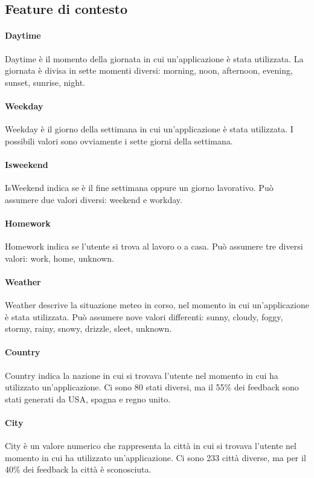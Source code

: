\documentclass[12pt,italian]{report}
\begin{document}
\subsection{Feature di contesto}
\paragraph{Daytime} Daytime è il momento della giornata in cui un'applicazione è stata utilizzata. La giornata è divisa in sette momenti diversi: morning, noon, afternoon, evening, sunset, sunrise, night.

\paragraph{Weekday} Weekday è il giorno della settimana in cui un'applicazione è stata utilizzata. I possibili valori sono ovviamente i sette giorni della settimana.

\paragraph{Isweekend} IsWeekend indica se è il fine settimana oppure un giorno lavorativo. Può assumere due valori diversi: weekend e workday.

\paragraph{Homework} Homework indica se l'utente si trova al lavoro o a casa. Può assumere tre diversi valori: work, home, unknown.

\paragraph{Weather} Weather descrive la situazione meteo in corso, nel momento in cui un'applicazione è stata utilizzata. Può assumere nove valori differenti: sunny, cloudy, foggy, stormy, rainy, snowy, drizzle, sleet, unknown.

\paragraph{Country} Country indica la nazione in cui si trovava l'utente nel momento in cui ha utilizzato un'applicazione. Ci sono 80 stati diversi, ma il 55\% dei feedback sono stati generati da USA, spagna e regno unito.

\paragraph{City} City è un valore numerico che rappresenta la città in cui si trovava l'utente nel momento in cui ha utilizzato un'applicazione. Ci sono 233 città diverse, ma per il 40\% dei feedback la città è sconosciuta.  
\end{document}
